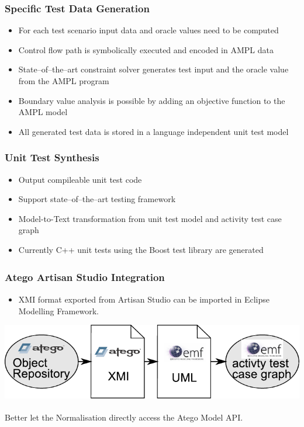 \begin{frame}
\frametitle{Specific Test Data Generation}
\begin{itemize} 
\item For each test scenario input data and oracle values need to be computed
\item Control flow path is symbolically executed and encoded in AMPL data
\item State--of--the--art constraint solver generates test input and the oracle value from the AMPL program
\item Boundary value analysis is possible by adding an objective function to the AMPL model
\item All generated test data is stored in a language independent unit test model
\end{itemize}
\end{frame}

\begin{frame}
\frametitle{Unit Test Synthesis}
\begin{itemize} 
\item Output compileable unit test code
\item Support state--of--the--art testing framework
\item Model-to-Text transformation from unit test model and activity test case graph
\item Currently C++ unit tests using the Boost test library are generated
\end{itemize}
\end{frame}

\begin{frame}
\frametitle{Atego\textsuperscript{\textregistered} Artisan Studio Integration}
\begin{itemize}
  \item XMI format exported from Artisan Studio can be imported in Eclipse Modelling Framework.
\end{itemize}
\includegraphics[width=\textwidth]{./pics/AtegoATCGConversion.pdf}
\begin{block}{}
Better let the Normalisation directly access the Atego\textsuperscript{\textregistered} Model API.
\end{block}
\end{frame}

